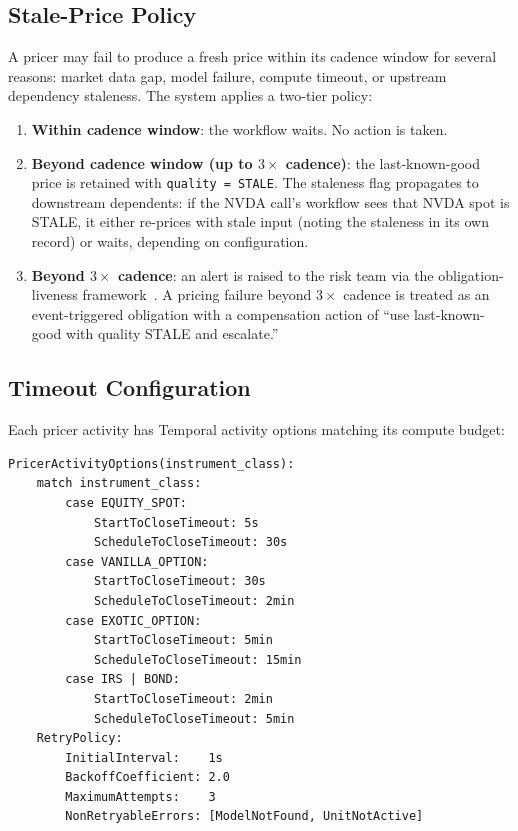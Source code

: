 \documentclass[11pt,a4paper]{article}
\begin{document}
\subsection{Stale-Price Policy}

A pricer may fail to produce a fresh price within its cadence window for several reasons: market data gap, model failure, compute timeout, or upstream dependency staleness.  The system applies a two-tier policy:

\begin{enumerate}
\item \textbf{Within cadence window}: the workflow waits.  No action is taken.
\item \textbf{Beyond cadence window (up to $3\times$ cadence)}: the last-known-good price is retained with \texttt{quality = STALE}.  The staleness flag propagates to downstream dependents: if the NVDA call's workflow sees that NVDA spot is STALE, it either re-prices with stale input (noting the staleness in its own record) or waits, depending on configuration.
\item \textbf{Beyond $3\times$ cadence}: an alert is raised to the risk team via the obligation-liveness framework~\cite[\S14.7]{ledger}.  A pricing failure beyond $3\times$ cadence is treated as an event-triggered obligation with a compensation action of ``use last-known-good with quality STALE and escalate.''
\end{enumerate}

\subsection{Timeout Configuration}

Each pricer activity has Temporal activity options matching its compute budget:

\begin{lstlisting}
PricerActivityOptions(instrument_class):
    match instrument_class:
        case EQUITY_SPOT:
            StartToCloseTimeout: 5s
            ScheduleToCloseTimeout: 30s
        case VANILLA_OPTION:
            StartToCloseTimeout: 30s
            ScheduleToCloseTimeout: 2min
        case EXOTIC_OPTION:
            StartToCloseTimeout: 5min
            ScheduleToCloseTimeout: 15min
        case IRS | BOND:
            StartToCloseTimeout: 2min
            ScheduleToCloseTimeout: 5min
    RetryPolicy:
        InitialInterval:    1s
        BackoffCoefficient: 2.0
        MaximumAttempts:    3
        NonRetryableErrors: [ModelNotFound, UnitNotActive]
\end{lstlisting}
\end{document}
